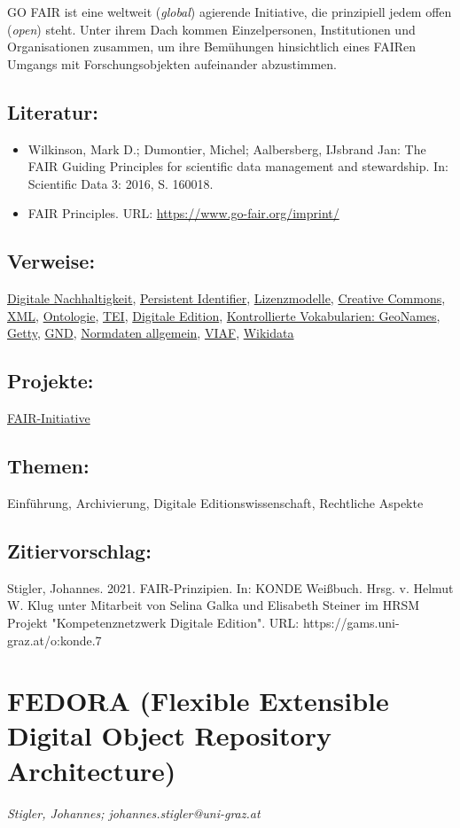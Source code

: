 \documentclass{article}
\begin{document}
        GO FAIR ist eine weltweit (\emph{global}) agierende Initiative, die prinzipiell jedem offen (\emph{open}) steht. Unter ihrem Dach kommen Einzelpersonen, Institutionen und Organisationen zusammen, um ihre Bemühungen hinsichtlich eines FAIRen Umgangs mit Forschungsobjekten aufeinander abzustimmen.\\
            
        \subsection*{Literatur:}\begin{itemize}\item Wilkinson, Mark D.; Dumontier, Michel; Aalbersberg, IJsbrand Jan: The FAIR Guiding Principles for scientific data management and stewardship. In: Scientific Data 3: 2016, S. 160018.\item FAIR Principles. URL: \url{https://www.go-fair.org/imprint/}\end{itemize}\subsection*{Verweise:}\href{https://gams.uni-graz.at/o:konde.6}{Digitale Nachhaltigkeit}, \href{https://gams.uni-graz.at/o:konde.12}{Persistent Identifier}, \href{https://gams.uni-graz.at/o:konde.9}{Lizenzmodelle}, \href{https://gams.uni-graz.at/o:konde.45}{Creative Commons}, \href{https://gams.uni-graz.at/o:konde.215}{XML}, \href{https://gams.uni-graz.at/o:konde.151}{Ontologie}, \href{https://gams.uni-graz.at/o:konde.178}{TEI}, \href{https://gams.uni-graz.at/o:konde.59}{Digitale Edition}, \href{https://gams.uni-graz.at/o:konde.107}{Kontrollierte Vokabularien: GeoNames}, \href{https://gams.uni-graz.at/o:konde.108}{Getty}, \href{https://gams.uni-graz.at/o:konde.109}{GND}, \href{https://gams.uni-graz.at/o:konde.147}{Normdaten allgemein}, \href{https://gams.uni-graz.at/o:konde.111}{VIAF}, \href{https://gams.uni-graz.at/o:konde.112}{Wikidata}\subsection*{Projekte:}\href{https://www.go-fair.org/}{FAIR-Initiative}\subsection*{Themen:}Einführung, Archivierung, Digitale Editionswissenschaft, Rechtliche Aspekte\subsection*{Zitiervorschlag:}Stigler, Johannes. 2021. FAIR-Prinzipien. In: KONDE Weißbuch. Hrsg. v. Helmut W. Klug unter Mitarbeit von Selina Galka und Elisabeth Steiner im HRSM Projekt "Kompetenznetzwerk Digitale Edition". URL: https://gams.uni-graz.at/o:konde.7\newpage\section*{FEDORA (Flexible Extensible Digital Object Repository Architecture)} \emph{Stigler, Johannes; johannes.stigler@uni-graz.at }\\
        
\end{document}
